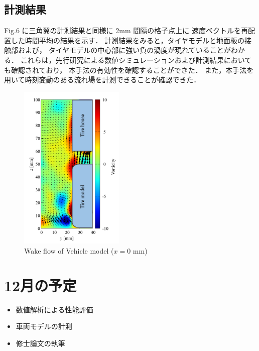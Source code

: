 \documentclass[twocolumn,a4j]{jsarticle}
\begin{document}
\newpage
\subsection{計測結果}
Fig.6 に三角翼の計測結果と同様に 2mm 間隔の格子点上に
速度ベクトルを再配置した時間平均の結果を示す．
計測結果をみると，タイヤモデルと地面板の接触部および，
タイヤモデルの中心部に強い負の渦度が現れていることがわかる．
これらは，先行研究による数値シミュレーションおよび計測結果においても確認されており，
本手法の有効性を確認することができた．
また，本手法を用いて時刻変動のある流れ場を計測できることが確認できた．

\begin{figure}[htbp]
  \centering
  \includegraphics[keepaspectratio, width=50mm]{../images/WakeofVehicleModel_Vorticity_x=0.png}
  \caption{Wake flow of Vehicle model ($x=0$ mm)}
\end{figure}

\section*{12月の予定}
\begin{itemize}
  \item 数値解析による性能評価
  \item 車両モデルの計測
  \item 修士論文の執筆
\end{itemize}
\end{document}
